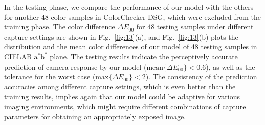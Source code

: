 \documentclass[9pt,twocolumn,twoside]{osajnl}
\begin{document}
	In the testing phase, we compare the performance of our model with the others for another 48 color samples in ColorChecker DSG, which were excluded from the training phase. The color difference $\Delta{}E_{00}$ for 48 testing samples under different capture settings are shown in Fig.~\ref{fig:13}(a), and Fig.~\ref{fig:13}(b) plots the distribution and the mean color differences of our model of 48 testing samples in CIELAB $\text{a}^*\text{b}^*$ plane. The testing results indicate the perceptively accurate prediction of camera response by our model ($\text{mean}\{\Delta{}E_{00}\} < 0.6$), as well as the tolerance for the worst case ($\text{max}\{\Delta{}E_{00}\} < 2$). The consistency of the prediction accuracies among different capture settings, which is even better than the training results, implies again that our model could be adaptive for various imaging environments, which might require different combinations of capture parameters for obtaining an appropriately exposed image. 
	
\end{document}
